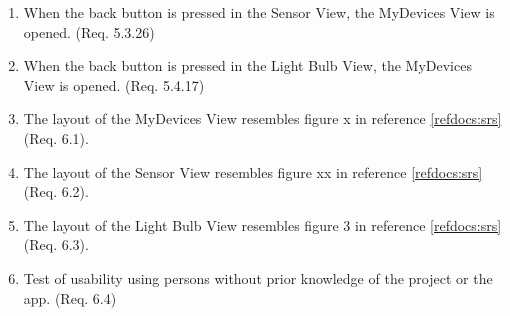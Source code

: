 \documentclass[a4paper]{article}
\newlength{\testlabellength}
\newenvironment{testlist}{\begin{enumerate}[label=\bfseries Test \thesubsection.\arabic* , labelindent=0pt, labelwidth=\testlabellength , leftmargin=2cm]}{\end{enumerate}}
\begin{document}
\begin{appendices}
\begin{testlist}
	\item When the back button is pressed in the Sensor View, the MyDevices View is opened. (Req. 5.3.26)
	
	\item When the back button is pressed in the Light Bulb View, the MyDevices View is opened. (Req. 5.4.17)
	
	\item The layout of the MyDevices View resembles figure x in reference \ref{refdocs:srs} (Req. 6.1).
	
	\item The layout of the Sensor View resembles figure xx in reference \ref{refdocs:srs} (Req. 6.2).
	\item The layout of the Light Bulb View resembles figure 3 in reference \ref{refdocs:srs} (Req. 6.3).
	
	\item Test of usability using persons without prior knowledge of the project or the app. (Req. 6.4)
\end{testlist}

\end{appendices}
\end{document}
